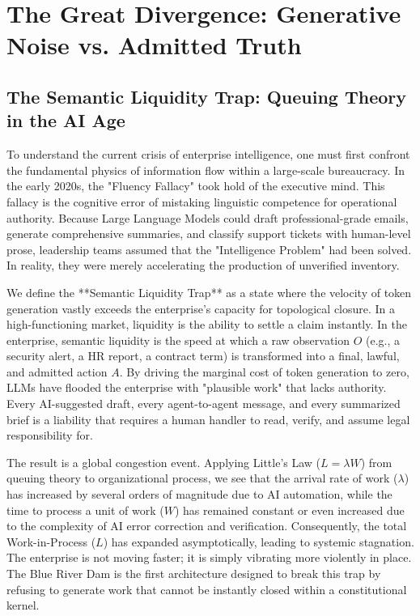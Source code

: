 \documentclass[12pt,a4paper,oneside]{book}
\begin{document}
\tableofcontents

\chapter{The Great Divergence: Generative Noise vs. Admitted Truth}

\section{The Semantic Liquidity Trap: Queuing Theory in the AI Age}
To understand the current crisis of enterprise intelligence, one must first confront the fundamental physics of information flow within a large-scale bureaucracy. In the early 2020s, the "Fluency Fallacy" took hold of the executive mind. This fallacy is the cognitive error of mistaking linguistic competence for operational authority. Because Large Language Models could draft professional-grade emails, generate comprehensive summaries, and classify support tickets with human-level prose, leadership teams assumed that the "Intelligence Problem" had been solved. In reality, they were merely accelerating the production of unverified inventory.

We define the **Semantic Liquidity Trap** as a state where the velocity of token generation vastly exceeds the enterprise's capacity for topological closure. In a high-functioning market, liquidity is the ability to settle a claim instantly. In the enterprise, semantic liquidity is the speed at which a raw observation $O$ (e.g., a security alert, a HR report, a contract term) is transformed into a final, lawful, and admitted action $A$. By driving the marginal cost of token generation to zero, LLMs have flooded the enterprise with "plausible work" that lacks authority. Every AI-suggested draft, every agent-to-agent message, and every summarized brief is a liability that requires a human handler to read, verify, and assume legal responsibility for.

The result is a global congestion event. Applying Little's Law ($L = \lambda W$) from queuing theory to organizational process, we see that the arrival rate of work ($\lambda$) has increased by several orders of magnitude due to AI automation, while the time to process a unit of work ($W$) has remained constant or even increased due to the complexity of AI error correction and verification. Consequently, the total Work-in-Process ($L$) has expanded asymptotically, leading to systemic stagnation. The enterprise is not moving faster; it is simply vibrating more violently in place. The Blue River Dam is the first architecture designed to break this trap by refusing to generate work that cannot be instantly closed within a constitutional kernel.
\end{document}
